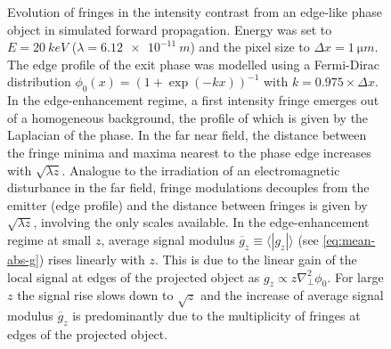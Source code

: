\documentclass[
twoside,
openright,
titlepage,
numbers=noenddot,
headinclude,
fleqn,
a4paper,
footinclude=true,
cleardoublepage=empty,
abstractoff,
BCOR=5mm,
paper=a4,
fontsize=11pt,
british,ngerman,american,
]{scrreprt}
\begin{document}
\begin{figure} 
  \centering
  \caption[Evolution of fringes in the propagated intensity from an
  edge-like phase object in simulated forward propagation.]{Evolution
    of fringes in the intensity contrast from an edge-like phase
    object in simulated forward propagation.  Energy was set to
    $E=\SI{20}{keV}$ ($\lambda=\SI{6.12e-11}{m}$) and the pixel size
    to $\Delta x = \SI{1}{\micro m}$.  The edge profile of the exit
    phase was modelled using a Fermi-Dirac distribution
    $\phi_0(x)=(1+\exp(-k x))^{-1}$ with $k=\num{0.975}\times\Delta
    x$.  In the edge-enhancement regime, a first intensity fringe
    emerges out of a homogeneous background, the profile of which is
    given by the Laplacian of the phase.  In the far near field, the
    distance between the fringe minima and maxima nearest to the phase
    edge increases with $\sqrt{\lambda z}$.  Analogue to the
    irradiation of an electromagnetic disturbance in the far field,
    fringe modulations decouples from the emitter (edge profile) and
    the distance between fringes is given by $\sqrt{\lambda z}$,
    involving the only scales available.  In the edge-enhancement
    regime at small $z$, average signal modulus
    $\overline{g}_z\equiv\langle|g_z|\rangle$ (see
    \protect\cref{eq:mean-abs-g}) rises linearly with $z$.  This is
    due to the linear gain of the local signal at edges of the
    projected object as $g_z\propto z \nabla_\perp^2\phi_0$.  For
    large $z$ the signal rise slows down to $\sqrt{z}$ and the
    increase of average signal modulus $\overline{g}_z$ is
    predominantly due to the multiplicity of fringes at edges of the
    projected object.}
  \label{fig:fringe-evolution}
\end{figure}
\end{document}
